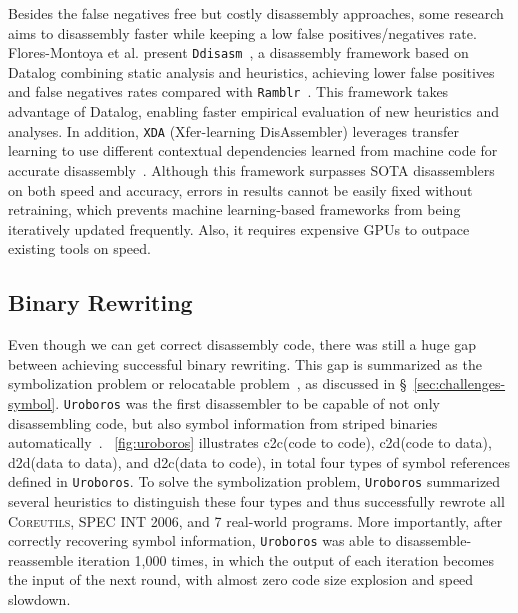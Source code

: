 Besides the false negatives free but costly disassembly approaches, some research aims to disassembly faster while keeping a low false positives/negatives rate. Flores-Montoya et al. present \texttt{Ddisasm}~\cite{flores2020datalog}, a disassembly framework based on Datalog combining static analysis and heuristics, achieving lower false positives and false negatives rates compared with \texttt{Ramblr}~\cite{wang2017ramblr}. This framework takes advantage of Datalog, enabling faster empirical evaluation of new heuristics and analyses.
In addition, \texttt{XDA} (Xfer-learning DisAssembler) leverages transfer learning to use different contextual dependencies learned from machine code for accurate disassembly~\cite{pei2020xda}. Although this framework surpasses SOTA disassemblers on both speed and accuracy, errors in results cannot be easily fixed without retraining, which prevents machine learning-based frameworks from being iteratively updated frequently. Also, it requires expensive GPUs to outpace existing tools on speed.

\subsection{Binary Rewriting} \label{sec:existing-symbolization}
Even though we can get correct disassembly code, there was still a huge gap between achieving successful binary rewriting. This gap is summarized as the symbolization problem or relocatable problem~\cite{wang2015reassembleable,wang2017ramblr}, as discussed in \S~\ref{sec:challenges-symbol}. \texttt{Uroboros} was the first disassembler to be capable of not only disassembling code, but also symbol information from striped binaries automatically~\cite{wang2015reassembleable}. \F~\ref{fig:uroboros} illustrates c2c(code to code), c2d(code to data), d2d(data to data), and d2c(data to code), in total four types of symbol references defined in \texttt{Uroboros}. To solve the symbolization problem, \texttt{Uroboros} summarized several heuristics to distinguish these four types and thus successfully rewrote all \textsc{Coreutils}, \textsc{SPEC INT 2006}, and 7 real-world programs. More importantly, after correctly recovering symbol information, \texttt{Uroboros} was able to disassemble-reassemble iteration 1,000 times, in which the output of each iteration becomes the input of the next round, with almost zero code size explosion and speed slowdown.

